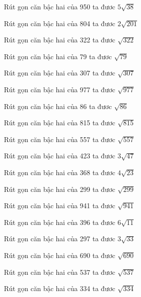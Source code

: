 \documentclass[12pt,a4paper]{article}
\begin{document}
\begin{ex}
Rút gọn căn bậc hai của 950 ta đươc $5\sqrt{38}$
\end{ex}
\begin{ex}
Rút gọn căn bậc hai của 804 ta đươc $2\sqrt{201}$
\end{ex}
\begin{ex}
Rút gọn căn bậc hai của 322 ta đươc $\sqrt{322}$
\end{ex}
\begin{ex}
Rút gọn căn bậc hai của 79 ta đươc $\sqrt{79}$
\end{ex}
\begin{ex}
Rút gọn căn bậc hai của 307 ta đươc $\sqrt{307}$
\end{ex}
\begin{ex}
Rút gọn căn bậc hai của 977 ta đươc $\sqrt{977}$
\end{ex}
\begin{ex}
Rút gọn căn bậc hai của 86 ta đươc $\sqrt{86}$
\end{ex}
\begin{ex}
Rút gọn căn bậc hai của 815 ta đươc $\sqrt{815}$
\end{ex}
\begin{ex}
Rút gọn căn bậc hai của 557 ta đươc $\sqrt{557}$
\end{ex}
\begin{ex}
Rút gọn căn bậc hai của 423 ta đươc $3\sqrt{47}$
\end{ex}
\begin{ex}
Rút gọn căn bậc hai của 368 ta đươc $4\sqrt{23}$
\end{ex}
\begin{ex}
Rút gọn căn bậc hai của 299 ta đươc $\sqrt{299}$
\end{ex}
\begin{ex}
Rút gọn căn bậc hai của 941 ta đươc $\sqrt{941}$
\end{ex}
\begin{ex}
Rút gọn căn bậc hai của 396 ta đươc $6\sqrt{11}$
\end{ex}
\begin{ex}
Rút gọn căn bậc hai của 297 ta đươc $3\sqrt{33}$
\end{ex}
\begin{ex}
Rút gọn căn bậc hai của 690 ta đươc $\sqrt{690}$
\end{ex}
\begin{ex}
Rút gọn căn bậc hai của 537 ta đươc $\sqrt{537}$
\end{ex}
\begin{ex}
Rút gọn căn bậc hai của 334 ta đươc $\sqrt{334}$
\end{ex}
\end{document}
